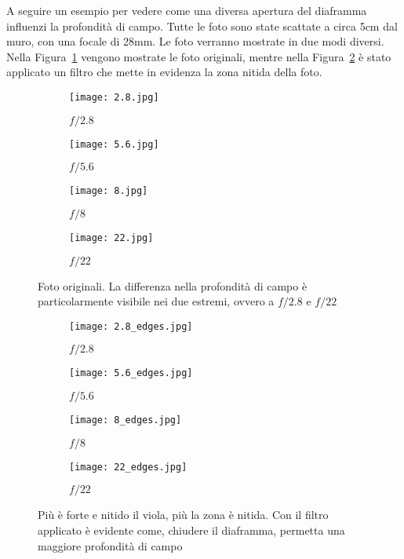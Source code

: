 A seguire un esempio per vedere come una diversa apertura del diaframma influenzi la profondità di campo. Tutte le foto sono state scattate a circa 5cm dal muro, con una focale di 28mm.
Le foto verranno mostrate in due modi diversi. Nella Figura~\ref{fig:muro_dof_originale} vengono mostrate le foto originali, mentre nella Figura~\ref{fig:muro_dof_bordi} è stato applicato un filtro che mette in evidenza la zona nitida della foto.

\begin{figure}[H] %
    \centering
        \begin{subfigure}{0.45\linewidth}
            \texttt{[image: 2.8.jpg]}
            \caption{$f/2.8$}
        \end{subfigure}
    \hfil
        \begin{subfigure}{0.45\linewidth}
            \texttt{[image: 5.6.jpg]}
            \caption{$f/5.6$}
        \end{subfigure}
    
        \begin{subfigure}{0.45\linewidth}
            \texttt{[image: 8.jpg]}
            \caption{$f/8$}
        \end{subfigure}
    \hfil
        \begin{subfigure}{0.45\linewidth}
            \texttt{[image: 22.jpg]}
            \caption{$f/22$}
        \end{subfigure}
    
    \caption{Foto originali. La differenza nella profondità di campo è particolarmente visibile nei due estremi, ovvero a $f/2.8$ e $f/22$}
    \label{fig:muro_dof_originale}
\end{figure}

\begin{figure}[H]
    \centering
        \begin{subfigure}{0.45\linewidth}
            \texttt{[image: 2.8\_edges.jpg]}
            \caption{$f/2.8$}
        \end{subfigure}
    \hfil
        \begin{subfigure}{0.45\linewidth}
            \texttt{[image: 5.6\_edges.jpg]}
            \caption{$f/5.6$}
        \end{subfigure}
    
        \begin{subfigure}{0.45\linewidth}
            \texttt{[image: 8\_edges.jpg]}
            \caption{$f/8$}
        \end{subfigure}
    \hfil
        \begin{subfigure}{0.45\linewidth}
            \texttt{[image: 22\_edges.jpg]}
            \caption{$f/22$}
        \end{subfigure}
    
    \caption{Più è forte e nitido il viola, più la zona è nitida. Con il filtro applicato è evidente come, chiudere il diaframma, permetta una maggiore profondità di campo}
    \label{fig:muro_dof_bordi}
\end{figure}


